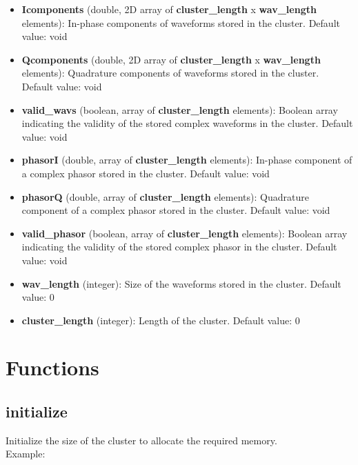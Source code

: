 \begin{itemize}
\item {\bf Icomponents} (double, 2D array of {\bf cluster\_length} x {\bf wav\_length} elements): In-phase components of waveforms stored in the cluster. Default value: void

\item {\bf Qcomponents} (double, 2D array of {\bf cluster\_length} x {\bf wav\_length} elements): Quadrature components of waveforms stored in the cluster. Default value: void

\item {\bf valid\_wavs} (boolean, array of {\bf cluster\_length} elements): Boolean array indicating the validity of the stored complex waveforms in the cluster. Default value: void

\item {\bf phasorI} (double, array of {\bf cluster\_length} elements): In-phase component of a complex phasor stored in the cluster. Default value: void

\item {\bf phasorQ} (double, array of {\bf cluster\_length} elements): Quadrature component of a complex phasor stored in the cluster. Default value: void

\item {\bf valid\_phasor} (boolean, array of {\bf cluster\_length} elements): Boolean array indicating the validity of the stored complex phasor in the cluster. Default value: void

\item {\bf wav\_length} (integer): Size of the waveforms stored in the cluster. Default value: 0

\item {\bf cluster\_length} (integer): Length of the cluster. Default value: 0
\end{itemize}


\section{Functions}

\subsection{initialize}

Initialize the size of the cluster to allocate the required memory.\\

Example:\\

